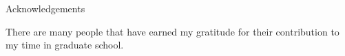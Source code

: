 \LARGE
Acknowledgements

\normalsize            
There are many people that have earned my gratitude for their contribution to my
time in graduate school.

\newpage

